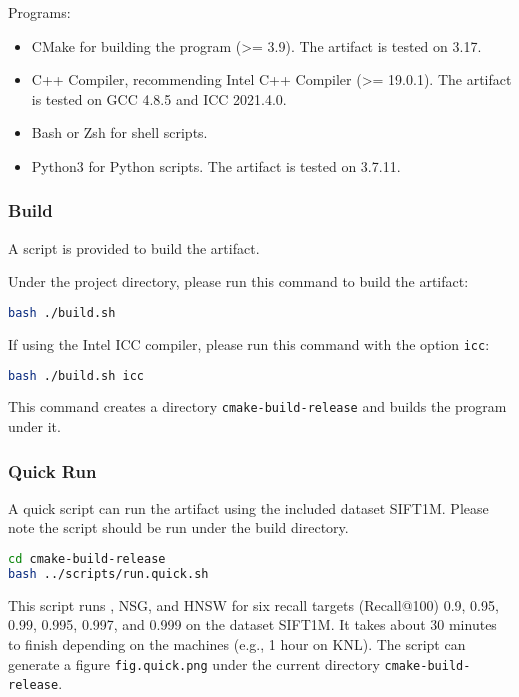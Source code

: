Programs:
\begin{itemize}
    \item CMake for building the program (>= 3.9). The artifact is tested on 3.17.
    \item C++ Compiler, recommending Intel C++ Compiler (>= 19.0.1). The artifact is tested on GCC 4.8.5 and ICC 2021.4.0.
    \item Bash or Zsh for shell scripts.
    \item Python3 for Python scripts. The artifact is tested on 3.7.11.
\end{itemize}


\subsubsection{Build} \label{minjia_subsubsec:build}
A script is provided to build the artifact.

Under the project directory, please run this command to build the artifact:
\begin{lstlisting}[language=bash]
bash ./build.sh
\end{lstlisting}

If using the Intel ICC compiler, please run this command with the option \verb|icc|:
\begin{lstlisting}[language=bash]
bash ./build.sh icc
\end{lstlisting}

This command creates a directory \verb|cmake-build-release| and builds the program under it.


\subsubsection{Quick Run}
A quick script can run the artifact using the included dataset SIFT1M. Please note the script should be run under the build directory.
\begin{lstlisting}[language=bash]
cd cmake-build-release
bash ../scripts/run.quick.sh
\end{lstlisting}

This script runs \Hammer, NSG, and HNSW for six recall targets (Recall@100) 0.9, 0.95, 0.99, 0.995, 0.997, and 0.999 on the dataset SIFT1M. It takes about 30 minutes to finish depending on the machines (e.g., 1 hour on KNL). 
The script can generate a figure \verb|fig.quick.png| under the current directory \verb|cmake-build-release|. 

